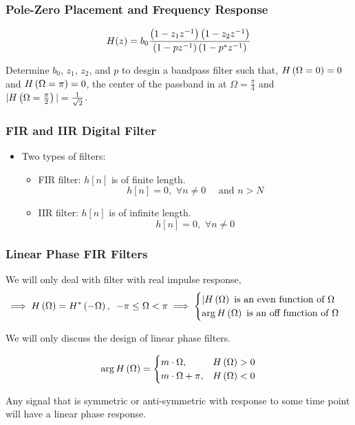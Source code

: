 \documentclass[aspectratio=169]{beamer}
\let\olditem\item
\renewcommand{\item}{\setlength{\itemsep}{\fill}\olditem}
\def\lp{\ensuremath\left(}
\def\rp{\ensuremath\right)}
\begin{document}
\begin{frame}[t]
  \frametitle{Pole-Zero Placement and Frequency Response}
  \[ H(z) = b_0\frac{\lp 1 - z_1z^{-1}\rp \lp 1 - z_2z^{-1}\rp}{\lp 1 - pz^{-1} \rp \lp 1 - p^{*}z^{-1} \rp} \]

  Determine $b_0$, $z_1$, $z_2$, and $p$ to desgin a bandpass filter such that, $H \lp \Omega = 0\rp = 0$ and $H \lp \Omega = \pi \rp = 0$, the center of the passband in at $\Omega = \frac{\pi}{4}$ and $\vert H\lp \Omega = \frac{\pi}{2} \rp \vert = \frac{1}{\sqrt{2}}$.
\end{frame}


\begin{frame}[t]
  \frametitle{FIR and IIR Digital Filter}
  \begin{itemize}
    \item Two types of filters:
    \begin{itemize}
      \item FIR filter: $h[n]$ is of finite length.
      \[ h[n] = 0, \,\, \forall n \neq 0 \quad \text{ and } n > N \]
      \item IIR filter: $h[n]$ is of infinite length.
      \[ h[n] = 0, \,\, \forall n \neq 0 \]
    \end{itemize}
  \end{itemize}
\end{frame}


\begin{frame}[t]
  \frametitle{Linear Phase FIR Filters}

  We will only deal with filter with real impulse response,
  \[ \implies H\lp \Omega \rp = H^*\lp -\Omega \rp, \,\,\, -\pi \leq \Omega < \pi \implies \begin{cases} \vert H\lp \Omega \rp \text{ is an even function of } \Omega \\
  \arg H\lp \Omega \rp \text{ is an off function of } \Omega \end{cases} \]

  We will only discuss the design of linear phase filters.

  \[  \arg H\lp \Omega \rp = \begin{cases} m \cdot \Omega, & H\lp \Omega  \rp > 0 \\ m \cdot \Omega + \pi, & H\lp \Omega \rp < 0 \end{cases} \]
  \vspace{0.1cm}

  Any signal that is symmetric or anti-symmetric with response to some time point will have a linear phase response.
  \vspace{0.25cm}
\end{frame}
\end{document}
